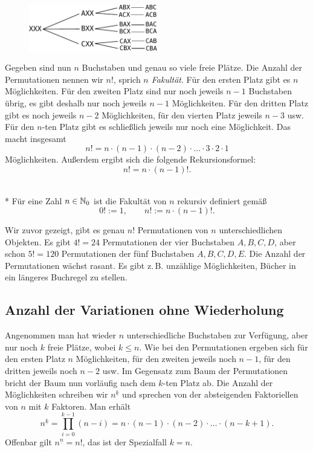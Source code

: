 \begin{figure}[h]
\begin{center}
\includegraphics[width=0.5\textwidth]{img/Perm-ABC.pdf}
\end{center}
\end{figure}

\noindent
Gegeben sind nun $n$ Buchstaben und genau so viele freie Plätze.
Die Anzahl der Permutationen nennen wir $n!$, sprich \emph{$n$ Fakultät}.
Für den ersten Platz gibt es $n$ Möglichkeiten. Für den zweiten Platz
sind nur noch jeweils $n-1$ Buchstaben übrig, es gibt deshalb nur noch
jeweils $n-1$ Möglichkeiten. Für den dritten Platz gibt es noch jeweils
$n-2$ Möglichkeiten, für den vierten Platz jeweils $n-3$ usw. Für den
$n$-ten Platz gibt es schließlich jeweils nur noch eine Möglichkeit.
Das macht insgesamt%
\[n! = n\cdot (n-1)\cdot (n-2)\cdot\ldots\cdot 3\cdot 2\cdot 1\]
Möglichkeiten. Außerdem ergibt sich die folgende Rekursionsformel:%
\[n! = n\cdot (n-1)!.\]
\begin{Definition}[Fakultät]%
\label{def:fac}\mbox{}\\*
Für eine Zahl $n\in\mathbb N_0$ ist die Fakultät von $n$ rekursiv
definiert gemäß%
\[0! := 1,\qquad n! := n\cdot (n-1)!.\]
\end{Definition}
Wir zuvor gezeigt, gibt es genau $n!$ Permutationen von $n$
unterschiedlichen Objekten. Es gibt $4!=24$ Permutationen
der vier Buchstaben $A,B,C,D$, aber schon $5!=120$ Permutationen der
fünf Buchstaben $A,B,C,D,E$. Die Anzahl der Permutationen wächst
rasant. Es gibt z.\,B. unzählige Möglichkeiten, Bücher in ein
längeres Buchregel zu stellen.


\subsection{Anzahl der Variationen ohne Wiederholung}%

Angenommen man hat wieder $n$ unterschiedliche Buchstaben
zur Verfügung, aber nur noch $k$ freie Plätze, wobei $k\le n$.
Wie bei den Permutationen ergeben sich für den ersten Platz
$n$ Möglichkeiten, für den zweiten jeweils noch $n-1$,
für den dritten jeweils noch $n-2$ usw. Im Gegensatz zum
Baum der Permutationen bricht der Baum nun vorläufig
nach dem $k$-ten Platz ab. Die Anzahl der Möglichkeiten schreiben
wir $n^{\underline k}$ und sprechen von der absteigenden Faktoriellen
von $n$ mit $k$ Faktoren. Man erhält%
\[n^{\underline k} = \prod_{i=0}^{k-1} (n-i)
= n\cdot (n-1)\cdot (n-2)\cdot\ldots\cdot (n-k+1).\]
Offenbar gilt $n^{\underline n} = n!$, das ist der Spezialfall $k=n$.

